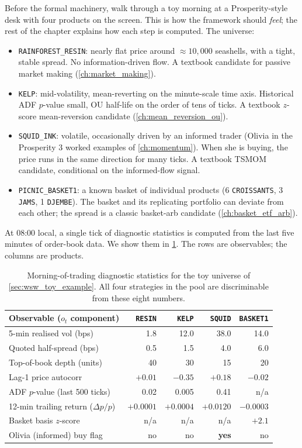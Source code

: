 Before the formal machinery, walk through a toy morning at a
Prosperity-style desk with four products on the screen. This is how
the framework should \emph{feel}; the rest of the chapter explains
how each step is computed. The universe:
\begin{itemize}
  \item \texttt{RAINFOREST\_RESIN}: nearly flat price around
  $\approx 10{,}000$ seashells, with a tight, stable spread. No
  information-driven flow. A textbook candidate for passive
  market making (\cref{ch:market_making}).
  \item \texttt{KELP}: mid-volatility, mean-reverting on the
  minute-scale time axis. Historical ADF $p$-value small, OU
  half-life on the order of tens of ticks. A textbook
  $z$-score mean-reversion candidate
  (\cref{ch:mean_reversion_ou}).
  \item \texttt{SQUID\_INK}: volatile, occasionally driven by
  an informed trader (Olivia in the Prosperity 3 worked
  examples of \cref{ch:momentum}). When she is buying, the
  price runs in the same direction for many ticks. A textbook
  TSMOM candidate, conditional on the informed-flow signal.
  \item \texttt{PICNIC\_BASKET1}: a known basket of
  individual products (6 \texttt{CROISSANTS}, 3
  \texttt{JAMS}, 1 \texttt{DJEMBE}). The basket and its
  replicating portfolio can deviate from each other; the
  spread is a classic basket-arb candidate
  (\cref{ch:basket_etf_arb}).
\end{itemize}

At 08:00 local, a single tick of diagnostic statistics is computed
from the last five minutes of order-book data. We show them in
\cref{tab:wsw_toy_observables}. The rows are observables; the
columns are products.

\begin{table}[htbp]
\centering
\begin{tabular}{lrrrr}
\toprule
Observable ($o_t$ component)
  & \texttt{RESIN} & \texttt{KELP} & \texttt{SQUID}
  & \texttt{BASKET1} \\
\midrule
5-min realised vol (bps) & 1.8 & 12.0 & 38.0 & 14.0 \\
Quoted half-spread (bps) & 0.5 & 1.5 & 4.0 & 6.0 \\
Top-of-book depth (units) & 40 & 30 & 15 & 20 \\
Lag-1 price autocorr & $+0.01$ & $-0.35$ & $+0.18$ & $-0.02$ \\
ADF $p$-value (last 500 ticks) & 0.02 & 0.005 & 0.41 & n/a \\
12-min trailing return ($\Delta p / p$) & $+0.0001$ & $+0.0004$ & $+0.0120$ & $-0.0003$ \\
Basket basis $z$-score & n/a & n/a & n/a & $+2.1$ \\
Olivia (informed) buy flag & no & no & \textbf{yes} & no \\
\bottomrule
\end{tabular}
\caption{Morning-of-trading diagnostic statistics for the toy
universe of \cref{sec:wsw_toy_example}. All four strategies in
the pool are discriminable from these eight numbers.}
\label{tab:wsw_toy_observables}
\end{table}

